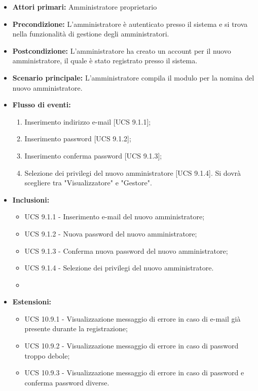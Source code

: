 \begin{itemize}
\item \textbf{Attori primari:} Amministratore proprietario
\item \textbf{Precondizione:} L'amministratore è autenticato presso il sistema e si trova nella funzionalità di gestione degli amministratori.
\item \textbf{Postcondizione:} L'amministratore ha creato un account per il nuovo amministratore, il quale è stato registrato presso il sistema.
\item \textbf{Scenario principale:} L'amministratore compila il modulo per la nomina del nuovo amministratore.
\item \textbf{Flusso di eventi:} %
  \begin{enumerate}
        \item Inserimento indirizzo e-mail [UCS 9.1.1];
        \item Inserimento password [UCS 9.1.2];
        \item Inserimento conferma password [UCS 9.1.3];
        \item Selezione dei privilegi del nuovo amministratore [UCS 9.1.4]. Si dovrà scegliere tra "Visualizzatore" e "Gestore".
    \end{enumerate}
    \item \textbf{Inclusioni:}
	\begin{itemize}
		\item UCS 9.1.1 - Inserimento e-mail del nuovo amministratore;
		\item UCS 9.1.2 - Nuova password del nuovo amministratore;
		\item UCS 9.1.3 - Conferma nuova password del nuovo amministratore;
		\item UCS 9.1.4 - Selezione dei privilegi del nuovo amministratore.
		\item 
	\end{itemize}
\item \textbf{Estensioni:}
	\begin{itemize}
		\item UCS 10.9.1 - Visualizzazione messaggio di errore in caso di e-mail già presente durante la registrazione;
		\item UCS 10.9.2 - Visualizzazione messaggio di errore in caso di password troppo debole;
		\item UCS 10.9.3 - Visualizzazione messaggio di errore in caso di password e conferma password diverse.
	\end{itemize}
\end{itemize}

